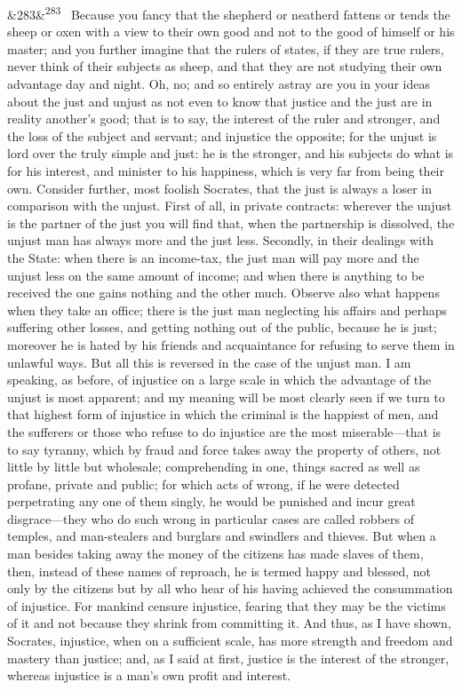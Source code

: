 \documentclass[12pt]{article}
\newcommand{\para}[1][]{\par\noindent\ifx&#1&\else\textsuperscript{\footnotesize #1}~\fi}
\begin{document}
\para[283] Because you fancy that the shepherd or neatherd fattens or tends the sheep or oxen with a view to their own good and not to the good of himself or his master; and you further imagine that the rulers of states, if they are true rulers, never think of their subjects as sheep, and that they are not studying their own advantage day and night. Oh, no; and so entirely astray are you in your ideas about the just and unjust as not even to know that justice and the just are in reality another's good; that is to say, the interest of the ruler and stronger, and the loss of the subject and servant; and injustice the opposite; for the unjust is lord over the truly simple and just: he is the stronger, and his subjects do what is for his interest, and minister to his happiness, which is very far from being their own. Consider further, most foolish Socrates, that the just is always a loser in comparison with the unjust. First of all, in private contracts: wherever the unjust is the partner of the just you will find that, when the partnership is dissolved, the unjust man has always more and the just less. Secondly, in their dealings with the State: when there is an income-tax, the just man will pay more and the unjust less on the same amount of income; and when there is anything to be received the one gains nothing and the other much. Observe also what happens when they take an office; there is the just man neglecting his affairs and perhaps suffering other losses, and getting nothing out of the public, because he is just; moreover he is hated by his friends and acquaintance for refusing to serve them in unlawful ways. But all this is reversed in the case of the unjust man. I am speaking, as before, of injustice on a large scale in which the advantage of the unjust is most apparent; and my meaning will be most clearly seen if we turn to that highest form of injustice in which the criminal is the happiest of men, and the sufferers or those who refuse to do injustice are the most miserable---that is to say tyranny, which by fraud and force takes away the property of others, not little by little but wholesale; comprehending in one, things sacred as well as profane, private and public; for which acts of wrong, if he were detected perpetrating any one of them singly, he would be punished and incur great disgrace---they who do such wrong in particular cases are called robbers of temples, and man-stealers and burglars and swindlers and thieves. But when a man besides taking away the money of the citizens has made slaves of them, then, instead of these names of reproach, he is termed happy and blessed, not only by the citizens but by all who hear of his having achieved the consummation of injustice. For mankind censure injustice, fearing that they may be the victims of it and not because they shrink from committing it. And thus, as I have shown, Socrates, injustice, when on a sufficient scale, has more strength and freedom and mastery than justice; and, as I said at first, justice is the interest of the stronger, whereas injustice is a man's own profit and interest.
\end{document}
